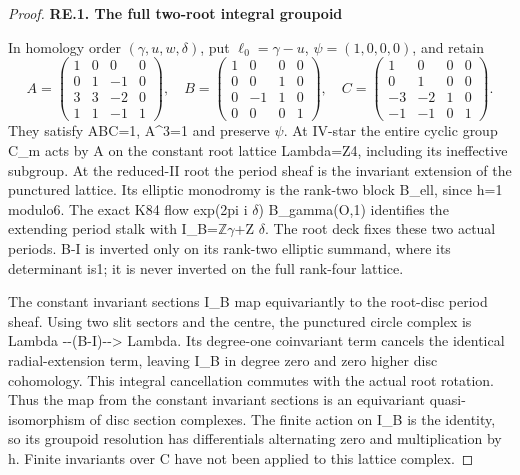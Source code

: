 \begin{proof}
\par

\medskip\noindent\textbf{RE.1. The full two-root integral groupoid}

\par\nobreak

In homology order \((\gamma,u,w,\delta)\), put
\(\ell_0=\gamma-u\), \(\psi=(1,0,0,0)\), and retain
\[
A=\begin{pmatrix}1&0&0&0\\0&1&-1&0\\3&3&-2&0\\1&1&-1&1\end{pmatrix},\quad
B=\begin{pmatrix}1&0&0&0\\0&0&1&0\\0&-1&1&0\\0&0&0&1\end{pmatrix},\quad
C=\begin{pmatrix}1&0&0&0\\0&1&0&0\\-3&-2&1&0\\-1&-1&0&1\end{pmatrix}.
\tag{RE.3}
\]
They satisfy ABC=1, A\^{}3=1 and preserve \(\psi\). At IV-star the entire
cyclic group C\_m acts by A on the constant root lattice Lambda=Z4,
including its ineffective subgroup. At the reduced-II root the period
sheaf is the invariant extension of the punctured lattice. Its elliptic
monodromy is the rank-two block B\_ell, since h=1 modulo6. The exact K84
flow exp(2pi i \(\delta\)) B\_gamma(O,1) identifies the extending period stalk
with I\_B=\(\mathbb Z\gamma\)+Z \(\delta\). The root deck fixes these two actual periods.
B-I is inverted only on its rank-two elliptic summand, where its
determinant is1; it is never inverted on the full rank-four lattice.

The constant invariant sections I\_B map equivariantly to the root-disc
period sheaf. Using two slit sectors and the centre, the punctured
circle complex is Lambda -\/-(B-I)-\/-\textgreater{} Lambda. Its degree-one coinvariant
term cancels the identical radial-extension term, leaving I\_B in degree
zero and zero higher disc cohomology. This integral cancellation commutes
with the actual root rotation. Thus the map from the constant invariant
sections is an equivariant quasi-isomorphism of disc section complexes.
The finite action on I\_B is the identity, so its groupoid resolution has
differentials alternating zero and multiplication by h. Finite invariants
over C have not been applied to this lattice complex.


\end{proof}
